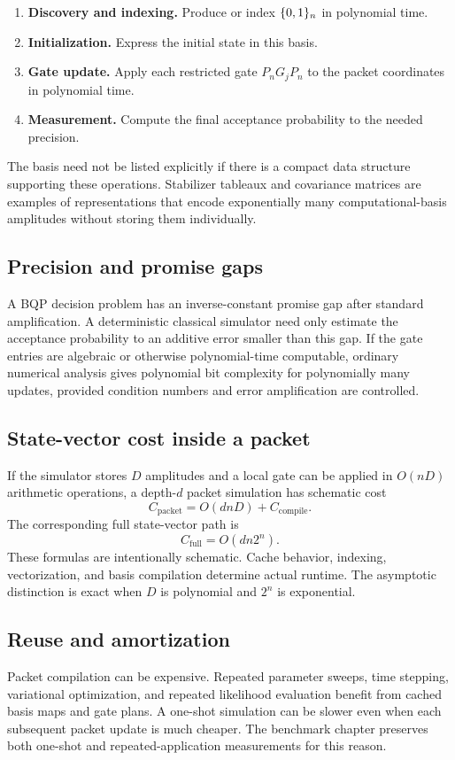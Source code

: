 \begin{enumerate}
\item \textbf{Discovery and indexing.} Produce or index $\{0,1\}_n$ in polynomial time.
\item \textbf{Initialization.} Express the initial state in this basis.
\item \textbf{Gate update.} Apply each restricted gate $P_nG_jP_n$ to the packet coordinates in polynomial time.
\item \textbf{Measurement.} Compute the final acceptance probability to the needed precision.
\end{enumerate}

The basis need not be listed explicitly if there is a compact data structure supporting these operations. Stabilizer tableaux and covariance matrices are examples of representations that encode exponentially many computational-basis amplitudes without storing them individually.

\subsection{Precision and promise gaps}
A BQP decision problem has an inverse-constant promise gap after standard amplification. A deterministic classical simulator need only estimate the acceptance probability to an additive error smaller than this gap. If the gate entries are algebraic or otherwise polynomial-time computable, ordinary numerical analysis gives polynomial bit complexity for polynomially many updates, provided condition numbers and error amplification are controlled.

\subsection{State-vector cost inside a packet}
If the simulator stores $D$ amplitudes and a local gate can be applied in $O(nD)$ arithmetic operations, a depth-$d$ packet simulation has schematic cost
\[
C_{\mathrm{packet}}=O(dnD)+C_{\mathrm{compile}}.
\]
The corresponding full state-vector path is
\[
C_{\mathrm{full}}=O(dn2^n).
\]
These formulas are intentionally schematic. Cache behavior, indexing, vectorization, and basis compilation determine actual runtime. The asymptotic distinction is exact when $D$ is polynomial and $2^n$ is exponential.

\subsection{Reuse and amortization}
Packet compilation can be expensive. Repeated parameter sweeps, time stepping, variational optimization, and repeated likelihood evaluation benefit from cached basis maps and gate plans. A one-shot simulation can be slower even when each subsequent packet update is much cheaper. The benchmark chapter preserves both one-shot and repeated-application measurements for this reason.

